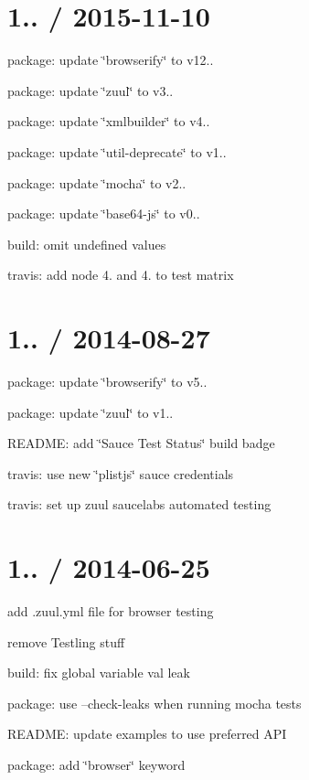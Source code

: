 \section*{1.. / 2015-\/11-\/10 }


\begin{DoxyItemize}
\item package\+: update \char`\"{}browserify\char`\"{} to v12..
\item package\+: update \char`\"{}zuul\char`\"{} to v3..
\item package\+: update \char`\"{}xmlbuilder\char`\"{} to v4..
\item package\+: update \char`\"{}util-\/deprecate\char`\"{} to v1..
\item package\+: update \char`\"{}mocha\char`\"{} to v2..
\item package\+: update \char`\"{}base64-\/js\char`\"{} to v0..
\item build\+: omit undefined values
\item travis\+: add node 4. and 4. to test matrix
\end{DoxyItemize}

\section*{1.. / 2014-\/08-\/27 }


\begin{DoxyItemize}
\item package\+: update \char`\"{}browserify\char`\"{} to v5..
\item package\+: update \char`\"{}zuul\char`\"{} to v1..
\item R\+E\+A\+D\+ME\+: add \char`\"{}\+Sauce Test Status\char`\"{} build badge
\item travis\+: use new \char`\"{}plistjs\char`\"{} sauce credentials
\item travis\+: set up zuul saucelabs automated testing
\end{DoxyItemize}

\section*{1.. / 2014-\/06-\/25 }


\begin{DoxyItemize}
\item add .zuul.\+yml file for browser testing
\item remove Testling stuff
\item build\+: fix global variable {\ttfamily val} leak
\item package\+: use --check-\/leaks when running mocha tests
\item R\+E\+A\+D\+ME\+: update examples to use preferred A\+PI
\item package\+: add \char`\"{}browser\char`\"{} keyword
\end{DoxyItemize}

